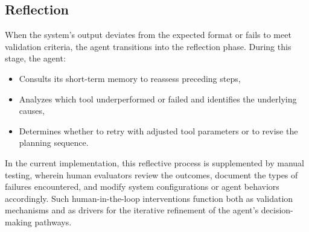 \subsection{Reflection}
When the system's output deviates from the expected format or fails to meet validation criteria, the agent transitions into the reflection phase. During this stage, the agent:

\begin{itemize}
    \item Consults its short-term memory to reassess preceding steps,
    \item Analyzes which tool underperformed or failed and identifies the underlying causes,
    \item Determines whether to retry with adjusted tool parameters or to revise the planning sequence.
\end{itemize}

In the current implementation, this reflective process is supplemented by manual testing, wherein human evaluators review the outcomes, document the types of failures encountered, and modify system configurations or agent behaviors accordingly. Such human-in-the-loop interventions function both as validation mechanisms and as drivers for the iterative refinement of the agent’s decision-making pathways.










